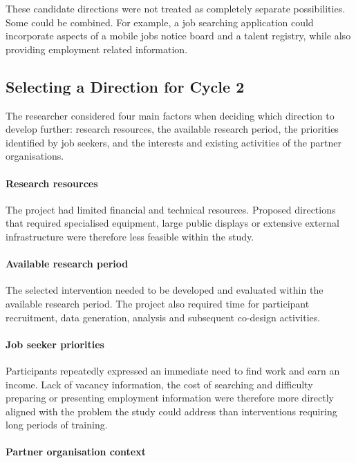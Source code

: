These candidate directions were not treated as completely separate possibilities. Some could be combined. For example, a job searching application could incorporate aspects of a mobile jobs notice board and a talent registry, while also providing employment related information.


\subsection{Selecting a Direction for Cycle 2}

The researcher considered four main factors when deciding which direction to develop further: research resources, the available research period, the priorities identified by job seekers, and the interests and existing activities of the partner organisations.

\paragraph{Research resources}

The project had limited financial and technical resources. Proposed directions that required specialised equipment, large public displays or extensive external infrastructure were therefore less feasible within the study.

\paragraph{Available research period}

The selected intervention needed to be developed and evaluated within the available research period. The project also required time for participant recruitment, data generation, analysis and subsequent co-design activities.

\paragraph{Job seeker priorities}

Participants repeatedly expressed an immediate need to find work and earn an income. Lack of vacancy information, the cost of searching and difficulty preparing or presenting employment information were therefore more directly aligned with the problem the study could address than interventions requiring long periods of training.

\paragraph{Partner organisation context}

